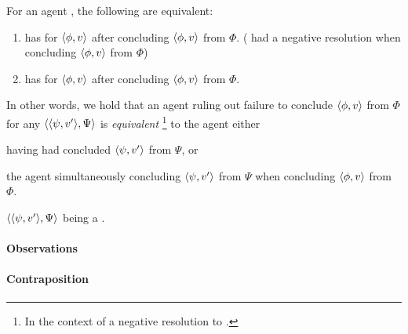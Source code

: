\begin{note}
  \begin{proposition}
    \label{prop:qzs-tick-equals-iCS}
    For an agent \vAgent{}, the following are equivalent:
    \begin{enumerate}[label=\arabic*., ref=(\arabic*)]
    \item
      \label{prop:qzs-tick-equals-iCS:qzS}
      \vAgent{} has \zS{} for \(\langle \phi, v \rangle\) after concluding \(\langle \phi, v \rangle\) from \(\Phi\).
      (\qzS{} had a negative resolution when concluding \(\langle \phi, v \rangle\) from \(\Phi\))
    \item
      \label{prop:qzs-tick-equals-iCS:ZS}
      \vAgent{} has \zetaS{} for \(\langle \phi, v \rangle\) after concluding \(\langle \phi, v \rangle\) from \(\Phi\).
    \end{enumerate}
    \vspace{-\baselineskip}
  \end{proposition}
  In other words, we hold that an agent ruling out failure to conclude \(\langle \phi, v \rangle\) from \(\Phi\) for any \requ{} \(\langle \langle \psi, v' \rangle, \Psi \rangle\) is \emph{equivalent}%
  \footnote{
    In the context of a negative resolution to \qzS{}.
  }
  to the agent either
  \begin{enumerate*}[label=(\alph*)]
  \item
    having had concluded \(\langle \psi, v' \rangle\) from \(\Psi\), or
  \item
    the agent simultaneously concluding \(\langle \psi, v' \rangle\) from \(\Psi\) when concluding \(\langle \phi, v \rangle\) from \(\Phi\).
  \item
    \(\langle \langle \psi, v' \rangle, \Psi \rangle\) being a .
  \end{enumerate*}
\end{note}

\paragraph*{Observations}

\paragraph*{Contraposition}

